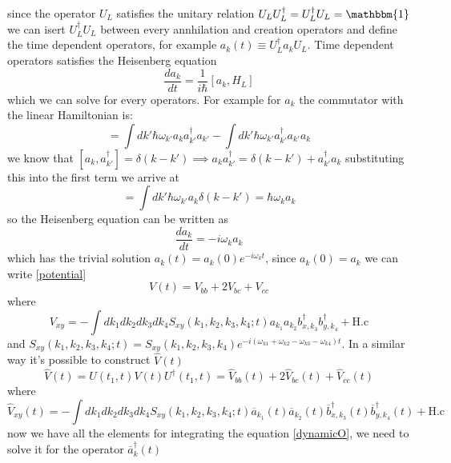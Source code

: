 since the operator $U_L$ satisfies the unitary relation $U_L U_L^\dagger = U_L^\dagger U_L = \mathbbm{1}$ we can isert $U_L^\dagger U_L$ between every annhilation and creation operators and define the time dependent operators, for example $a_{k}(t) \equiv U_L^\dagger a_{k}U_L$. Time dependent operators satisfies the Heisenberg equation
\begin{equation}\frac{da_{k}}{dt} = \frac{1}{i\hbar}[a_{k},H_L]\end{equation}
which we can solve for every operators. For example for $a_{k}$ the commutator with the linear Hamiltonian is:
\begin{equation}[a_{k},H_L] = \int dk'\hbar \omega_{k'}a_{k} a_{k'}^\dagger a_{k'}-\int dk'\hbar \omega_{k'}a_{k'}^\dagger a_{k'}a_{k}\end{equation}
we know that $[a_k,a_{k'}^\dagger] = \delta(k-k')\implies a_{k} a_{k'}^\dagger = \delta(k-k') + a_{k'}^\dagger a_{k}$ substituting this into the first term we arrive at
\begin{equation}[a_{k},H_L] = \int dk'\hbar \omega_{k'}a_{k}\delta(k-k') = \hbar \omega_{k}a_{k}\end{equation}
so the Heisenberg equation can be written as
\begin{equation}\frac{da_{k}}{dt} = -i\omega_{k}a_{k}\end{equation}
which has the trivial solution $a_k(t) = a_k(0)e^{-i\omega_k t}$, since $a_k(0) = a_k$ we can write \eqref{potential} 
\begin{equation}V(t) = V_{bb} + 2V_{bc} + V_{cc}\end{equation}
where
\begin{equation}V_{xy} = -\int dk_1dk_2dk_3dk_4S_{xy}(k_1,k_2,k_3,k_4;t)a_{k_1}a_{k_2}b_{x,k_3}^\dagger b_{y,k_4}^\dagger +\text{H.c} \end{equation}
and $S_{xy}(k_1,k_2,k_3,k_4;t) = S_{xy}(k_1,k_2,k_3,k_4)e^{-i(\omega_{k1}+\omega_{k2}-\omega_{k3}-\omega_{k4})t}$. In a similar way it's possible to construct $\hat{V}(t)$
\begin{equation}\hat{V}(t) = U(t_1,t)V(t)U^\dagger(t_1,t) = \hat{V}_{bb}(t) + 2\hat{V}_{bc}(t) + \hat{V}_{cc}(t)\end{equation}
where 
\begin{equation}\hat{V}_{xy}(t) = -\int dk_1dk_2dk_3dk_4S_{xy}(k_1,k_2,k_3,k_4;t)\overline{a}_{k_1}(t)\overline{a}_{k_2}(t)\overline{b}_{x,k_3}^\dagger(t) \overline{b}_{y,k_4}^\dagger(t) +\text{H.c}\end{equation}
now we have all the elements for integrating the equation \eqref{dynamicO}, we need to solve it for the operator $\overline{a}^\dagger_{k}(t)$
